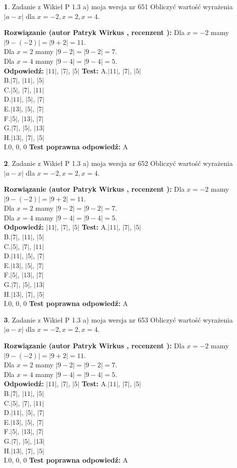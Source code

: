 \documentclass[12pt, a4paper]{article}
\theoremstyle{definition} %
\newtheorem{zad}{}
\newcommand{\zadStart}[1]{\begin{zad}#1\newline}
\newcommand{\zadStop}{\end{zad}}
\newcommand{\rozwStart}[2]{\noindent \textbf{Rozwiązanie (autor #1 , recenzent #2): }\newline}
\newcommand{\rozwStop}{\newline}
\newcommand{\odpStart}{\noindent \textbf{Odpowiedź:}\newline}
\newcommand{\odpStop}{\newline}
\newcommand{\testStart}{\noindent \textbf{Test:}\newline}
\newcommand{\testStop}{\newline}
\newcommand{\kluczStart}{\noindent \textbf{Test poprawna odpowiedź:}\newline}
\newcommand{\kluczStop}{\newline}
\begin{document}
\zadStart{Zadanie z Wikieł P 1.3 a) moja wersja nr 651}
Obliczyć wartość wyrażenia $|a - x|$ dla $x=-2,x=2,x=4$.
\zadStop
\rozwStart{Patryk Wirkus}{}
Dla $x = -2$ mamy $|9 - (-2)| = |9 + 2| = 11$.\\
Dla $x = 2$ mamy $|9 - 2| = |9 - 2| = 7$.\\
Dla $x = 4$ mamy $|9 - 4| = |9 - 4| = 5$.\\
\rozwStop
\odpStart
$|11|$, $|7|$, $|5|$
\odpStop
\testStart
A.$|11|$, $|7|$, $|5|$\\
B.$|7|$, $|11|$, $|5|$\\
C.$|5|$, $|7|$, $|11|$\\
D.$|11|$, $|5|$, $|7|$\\
E.$|13|$, $|5|$, $|7|$\\
F.$|5|$, $|13|$, $|7|$\\
G.$|7|$, $|5|$, $|13|$\\
H.$|13|$, $|7|$, $|5|$\\
I.$0$, $0$, $0$
\testStop
\kluczStart
A
\kluczStop



\zadStart{Zadanie z Wikieł P 1.3 a) moja wersja nr 652}
Obliczyć wartość wyrażenia $|a - x|$ dla $x=-2,x=2,x=4$.
\zadStop
\rozwStart{Patryk Wirkus}{}
Dla $x = -2$ mamy $|9 - (-2)| = |9 + 2| = 11$.\\
Dla $x = 2$ mamy $|9 - 2| = |9 - 2| = 7$.\\
Dla $x = 4$ mamy $|9 - 4| = |9 - 4| = 5$.\\
\rozwStop
\odpStart
$|11|$, $|7|$, $|5|$
\odpStop
\testStart
A.$|11|$, $|7|$, $|5|$\\
B.$|7|$, $|11|$, $|5|$\\
C.$|5|$, $|7|$, $|11|$\\
D.$|11|$, $|5|$, $|7|$\\
E.$|13|$, $|5|$, $|7|$\\
F.$|5|$, $|13|$, $|7|$\\
G.$|7|$, $|5|$, $|13|$\\
H.$|13|$, $|7|$, $|5|$\\
I.$0$, $0$, $0$
\testStop
\kluczStart
A
\kluczStop



\zadStart{Zadanie z Wikieł P 1.3 a) moja wersja nr 653}
Obliczyć wartość wyrażenia $|a - x|$ dla $x=-2,x=2,x=4$.
\zadStop
\rozwStart{Patryk Wirkus}{}
Dla $x = -2$ mamy $|9 - (-2)| = |9 + 2| = 11$.\\
Dla $x = 2$ mamy $|9 - 2| = |9 - 2| = 7$.\\
Dla $x = 4$ mamy $|9 - 4| = |9 - 4| = 5$.\\
\rozwStop
\odpStart
$|11|$, $|7|$, $|5|$
\odpStop
\testStart
A.$|11|$, $|7|$, $|5|$\\
B.$|7|$, $|11|$, $|5|$\\
C.$|5|$, $|7|$, $|11|$\\
D.$|11|$, $|5|$, $|7|$\\
E.$|13|$, $|5|$, $|7|$\\
F.$|5|$, $|13|$, $|7|$\\
G.$|7|$, $|5|$, $|13|$\\
H.$|13|$, $|7|$, $|5|$\\
I.$0$, $0$, $0$
\testStop
\kluczStart
A
\kluczStop
\end{document}
